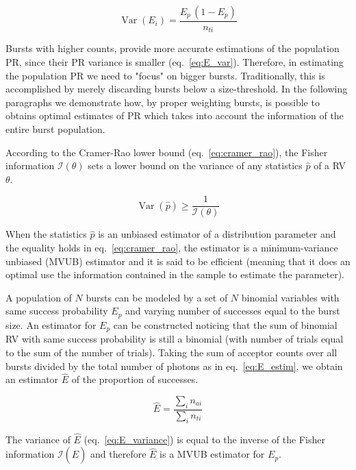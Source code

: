 \documentclass[10pt,letterpaper]{article}
\begin{document}
\begin{equation}
\label{eq:E_var}
\operatorname{Var} (E_i) = \frac{E_p\,(1 - E_p)}{n_{ti}}
\end{equation}

Bursts with higher counts, provide more accurate estimations 
of the population PR, since their PR variance is smaller (eq.~\ref{eq:E_var}). 
Therefore, in estimating the population PR we need to "focus" 
on bigger bursts.
Traditionally, this is accomplished by merely discarding bursts
below a size-threshold.
In the following paragraphs we demonstrate how, by proper weighting
bursts, is possible to obtains optimal estimates of PR which takes into 
account the information of the entire burst population.

According to the Cramer-Rao lower bound (eq.~\ref{eq:cramer_rao}), the 
Fisher information $\mathcal{I}(\theta)$ sets a lower bound on the
variance of any statistics $\hat{p}$ of a RV $\theta$.

\begin{equation}
\label{eq:cramer_rao}
\operatorname{Var}\left(\hat{p}\right) \ge \frac{1}{\mathcal{I}(\theta)}
\end{equation}

When the statistics $\hat{p}$ is an unbiased estimator of a distribution 
parameter and the equality holds in eq.~\ref{eq:cramer_rao},
the estimator is a minimum-variance unbiased (MVUB) estimator 
and it is said to be efficient (meaning that it does an
optimal use the information contained in the sample to estimate the
parameter).

A population of $N$ bursts can be modeled by a set of $N$ binomial
variables with same success probability $E_p$ and varying number of successes
equal to the burst size. An estimator for $E_p$ can be constructed
noticing that the sum of binomial RV with same 
success probability is still a binomial (with number of trials equal to 
the sum of the number of trials).
Taking the sum of acceptor counts over all bursts divided by the total 
number of photons as in eq.~\ref{eq:E_estim}, we obtain 
an estimator $\hat{E}$ of the proportion of successes.

\begin{equation}
\label{eq:E_estim}
\hat{E} = \frac{\sum_i n_{ai}}{\sum_i n_{ti}}
\end{equation}

The variance of $\hat{E}$ (eq.~\ref{eq:E_variance}) is equal to the inverse of 
the Fisher information $\mathcal{I}(\hat{E})$ and therefore $\hat{E}$ is a MVUB 
estimator for $E_p$.
\end{document}
